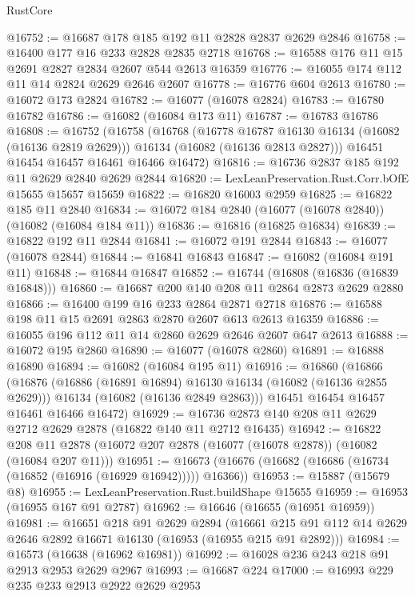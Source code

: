 \begin{lexlean}{RustCore}
\begin{coremodule}
@16752 := @16687 @178 @185 @192 @11 @2828 @2837 @2629 @2846
@16758 := @16400 @177 @16 @233 @2828 @2835 @2718
@16768 := @16588 @176 @11 @15 @2691 @2827 @2834 @2607 @544 @2613 @16359
@16776 := @16055 @174 @112 @11 @14 @2824 @2629 @2646 @2607
@16778 := @16776 @604 @2613
@16780 := @16072 @173 @2824
@16782 := @16077 (@16078 @2824)
@16783 := @16780 @16782
@16786 := @16082 (@16084 @173 @11)
@16787 := @16783 @16786
@16808 := @16752
    (@16758
      (@16768
        (@16778 @16787 @16130 @16134 (@16082 (@16136 @2819 @2629)))
        @16134
        (@16082 (@16136 @2813 @2827)))
      @16451
      @16454
      @16457
      @16461
      @16466
      @16472)
@16816 := @16736 @2837 @185 @192 @11 @2629 @2840 @2629 @2844
@16820 := LexLeanPreservation.Rust.Corr.bOfE @15655 @15657 @15659
@16822 := @16820 @16003 @2959
@16825 := @16822 @185 @11 @2840
@16834 := @16072 @184 @2840 (@16077 (@16078 @2840)) (@16082 (@16084 @184 @11))
@16836 := @16816 (@16825 @16834)
@16839 := @16822 @192 @11 @2844
@16841 := @16072 @191 @2844
@16843 := @16077 (@16078 @2844)
@16844 := @16841 @16843
@16847 := @16082 (@16084 @191 @11)
@16848 := @16844 @16847
@16852 := @16744 (@16808 (@16836 (@16839 @16848)))
@16860 := @16687 @200 @140 @208 @11 @2864 @2873 @2629 @2880
@16866 := @16400 @199 @16 @233 @2864 @2871 @2718
@16876 := @16588 @198 @11 @15 @2691 @2863 @2870 @2607 @613 @2613 @16359
@16886 := @16055 @196 @112 @11 @14 @2860 @2629 @2646 @2607 @647 @2613
@16888 := @16072 @195 @2860
@16890 := @16077 (@16078 @2860)
@16891 := @16888 @16890
@16894 := @16082 (@16084 @195 @11)
@16916 := @16860
    (@16866
      (@16876
        (@16886 (@16891 @16894) @16130 @16134 (@16082 (@16136 @2855 @2629)))
        @16134
        (@16082 (@16136 @2849 @2863)))
      @16451
      @16454
      @16457
      @16461
      @16466
      @16472)
@16929 := @16736 @2873 @140 @208 @11 @2629 @2712 @2629 @2878 (@16822 @140 @11 @2712 @16435)
@16942 := @16822
    @208
    @11
    @2878
    (@16072 @207 @2878 (@16077 (@16078 @2878)) (@16082 (@16084 @207 @11)))
@16951 := @16673 (@16676 (@16682 (@16686 (@16734 (@16852 (@16916 (@16929 @16942))))) @16366))
@16953 := @15887 (@15679 @8)
@16955 := LexLeanPreservation.Rust.buildShape @15655
@16959 := @16953 (@16955 @167 @91 @2787)
@16962 := @16646 (@16655 (@16951 @16959))
@16981 := @16651
    @218
    @91
    @2629
    @2894
    (@16661 @215 @91 @112 @14 @2629 @2646 @2892 @16671 @16130 (@16953 (@16955 @215 @91 @2892)))
@16984 := @16573 (@16638 (@16962 @16981))
@16992 := @16028 @236 @243 @218 @91 @2913 @2953 @2629 @2967
@16993 := @16687 @224
@17000 := @16993 @229 @235 @233 @2913 @2922 @2629 @2953

\end{coremodule}
\end{lexlean}
